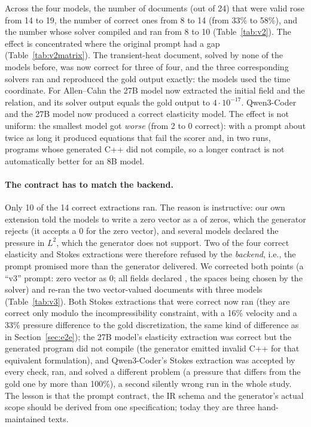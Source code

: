 Across the four models, the number of documents (out of 24) that were valid rose from 14 to 19, the number of correct ones from 8 to 14 (from 33\% to 58\%), and the number whose solver compiled and ran from 8 to 10 (Table~\ref{tab:v2}). The effect is concentrated where the original prompt had a gap (Table~\ref{tab:v2matrix}). The transient-heat document, solved by none of the models before, was now correct for three of four, and the three corresponding solvers ran and reproduced the gold output exactly: the models used the time coordinate. For Allen--Cahn the 27B model now extracted the initial field and the relation, and its solver output equals the gold output to $4\cdot10^{-17}$. Qwen3-Coder and the 27B model now produced a correct elasticity model. The effect is not uniform: the smallest model got \emph{worse} (from 2 to 0 correct): with a prompt about twice as long it produced equations that fail the scorer and, in two runs, programs whose generated C++ did not compile, so a longer contract is not automatically better for an 8B model.

\paragraph{The contract has to match the backend.} Only 10 of the 14 correct extractions ran. The reason is instructive: our own extension told the models to write a zero vector as a  of zeros, which the generator rejects (it accepts a  $0$ for the zero vector), and several models declared the pressure in $L^2$, which the generator does not support. Two of the four correct elasticity and Stokes extractions were therefore refused by the \emph{backend}, i.e., the prompt promised more than the generator delivered. We corrected both points (a ``v3'' prompt: zero vector as  $0$; all fields declared , the spaces being chosen by the solver) and re-ran the two vector-valued documents with three models (Table~\ref{tab:v3}). Both Stokes extractions that were correct now ran (they are correct only modulo the incompressibility constraint, with a 16\% velocity and a 33\% pressure difference to the gold discretization, the same kind of difference as in Section~\ref{sec:e2e}); the 27B model's elasticity extraction was correct but the generated program did not compile (the generator emitted invalid C++ for that equivalent formulation), and Qwen3-Coder's Stokes extraction was accepted by every check, ran, and solved a different problem (a pressure that differs from the gold one by more than 100\%), a second silently wrong run in the whole study. The lesson is that the prompt contract, the IR schema and the generator's actual scope should be derived from one specification; today they are three hand-maintained texts.

